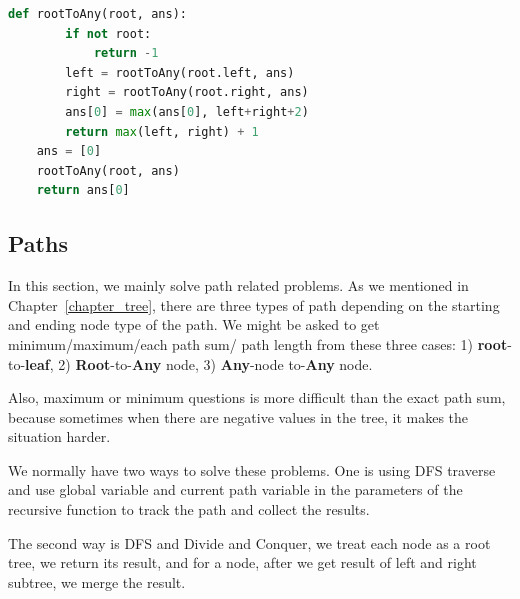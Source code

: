 \documentclass[../main.tex]{subfiles}
\begin{document}
\begin{examples}[resume]
\begin{lstlisting}[language=Python]
    def rootToAny(root, ans):
        if not root:
            return -1
        left = rootToAny(root.left, ans)
        right = rootToAny(root.right, ans)
        ans[0] = max(ans[0], left+right+2)
        return max(left, right) + 1
    ans = [0]
    rootToAny(root, ans)
    return ans[0]
\end{lstlisting}
\end{examples}
\subsection{Paths} 
In this section, we mainly solve path related problems. As we mentioned in Chapter~\ref{chapter_tree}, there are three types of path depending on the starting and ending node type of the path. We might be asked to get minimum/maximum/each path sum/ path length from these three cases: 1) \textbf{root}-to-\textbf{leaf}, 2) \textbf{Root}-to-\textbf{Any} node, 3) \textbf{Any}-node to-\textbf{Any} node. 

Also, maximum or minimum questions is more difficult than the exact path sum, because sometimes when there are negative values in the tree, it makes the situation harder. 

We normally have two ways to solve these problems. One is using DFS traverse and use global variable and current path variable in the parameters of the recursive function to track the path and collect the results.

The second way is DFS and Divide and Conquer, we treat each node as a root tree, we return its result, and for a node, after we get result of left and right subtree, we merge the result. 
\end{document}
